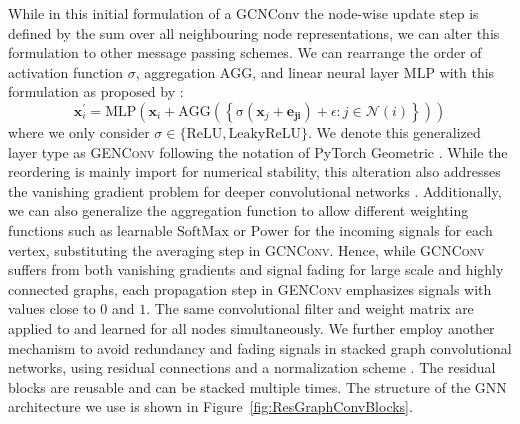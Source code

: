 \documentclass{bioinfo}
\renewcommand{\cite}{\citep}
\begin{document}
While in this initial formulation of a GCNConv the node-wise update
step is defined by the sum over all neighbouring node representations,
we can alter this formulation to other message passing schemes.  We
can rearrange the order of activation function $\sigma$, aggregation
$\mathrm{AGG}$, and linear neural layer $\mathrm{MLP}$ with this
formulation as proposed by \citet{GENConv2020}:
\begin{equation}
	\mathbf{x}_i^{\prime} = \mathrm{MLP} \left( \mathbf{x}_i +
	\mathrm{AGG} \left( \left\{
	\mathrm{\sigma} \left( \mathbf{x}_j + \mathbf{e_{ji}} \right) +\epsilon
	: j \in \mathcal{N}(i) \right\} \right)
	\right)
\end{equation}
where we only consider
$\sigma \in \{\mathrm{ReLU}, \mathrm{LeakyReLU}\}$. We denote
this generalized layer type as \textsc{GENConv} following the
notation of PyTorch Geometric \cite{PytorchGeometric}.  While the
reordering is mainly import for numerical stability, this alteration
also addresses the vanishing gradient problem for deeper convolutional
networks \cite{GENConv2020}. Additionally, we can also generalize the
aggregation function to allow different weighting functions such as
learnable $\mathrm{SoftMax}$ or $\mathrm{Power}$ for the incoming
signals for each vertex, substituting the averaging step in
\textsc{GCNConv}. Hence, while \textsc{GCNConv} suffers from both
vanishing gradients and signal fading for large scale and highly
connected graphs, each propagation step in \textsc{GENConv} emphasizes
signals with values close to $0$ and $1$. The same convolutional
filter and weight matrix are applied to and learned for all nodes
simultaneously. %
We further employ another mechanism to avoid redundancy and fading
signals in stacked graph convolutional networks, using residual
connections and a normalization scheme \cite{DeepGCN2019,
  DeeperGCN2020}.  The residual blocks are reusable and can be stacked
multiple times. The structure of the GNN architecture we use is shown
in Figure~\ref{fig:ResGraphConvBlocks}.
\end{document}
